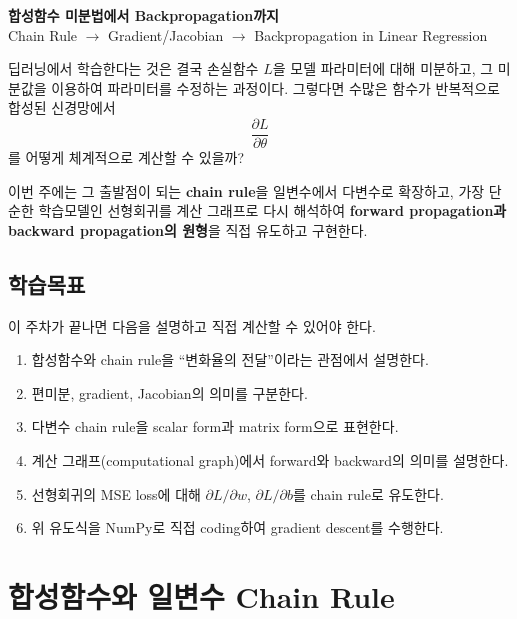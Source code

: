 \documentclass[11pt,a4paper]{article}
\begin{document}
\begin{center}
{\LARGE\bfseries 합성함수 미분법에서 Backpropagation까지}\\[0.35em]
{\Large Chain Rule $\rightarrow$ Gradient/Jacobian $\rightarrow$ Backpropagation in Linear Regression}\\[0.8em]
\end{center}

\vspace{0.4em}

\begin{keybox}[이번 주의 핵심 질문]
딥러닝에서 학습한다는 것은 결국 손실함수 $L$을 모델 파라미터에 대해 미분하고,
그 미분값을 이용하여 파라미터를 수정하는 과정이다. 그렇다면 수많은 함수가 반복적으로
합성된 신경망에서
\[
\frac{\partial L}{\partial \theta}
\]
를 어떻게 체계적으로 계산할 수 있을까?

이번 주에는 그 출발점이 되는 \textbf{chain rule}을 일변수에서 다변수로 확장하고,
가장 단순한 학습모델인 선형회귀를 계산 그래프로 다시 해석하여
\textbf{forward propagation과 backward propagation의 원형}을 직접 유도하고 구현한다.
\end{keybox}

\subsection*{학습목표}
이 주차가 끝나면 다음을 설명하고 직접 계산할 수 있어야 한다.
\begin{enumerate}[label=\arabic*.]
\item 합성함수와 chain rule을 ``변화율의 전달''이라는 관점에서 설명한다.
\item 편미분, gradient, Jacobian의 의미를 구분한다.
\item 다변수 chain rule을 scalar form과 matrix form으로 표현한다.
\item 계산 그래프(computational graph)에서 forward와 backward의 의미를 설명한다.
\item 선형회귀의 MSE loss에 대해 $\partial L/\partial w$, $\partial L/\partial b$를 chain rule로 유도한다.
\item 위 유도식을 NumPy로 직접 coding하여 gradient descent를 수행한다.

\end{enumerate}



\section{합성함수와 일변수 Chain Rule}
\end{document}
